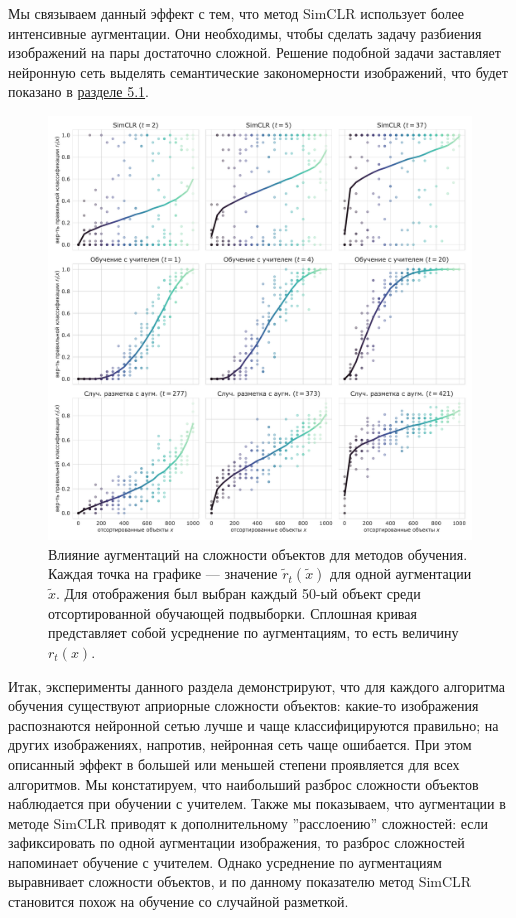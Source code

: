 Мы связываем данный эффект с тем, что метод SimCLR использует более интенсивные аугментации. Они необходимы, чтобы сделать задачу разбиения изображений на пары достаточно сложной. Решение подобной задачи заставляет нейронную сеть выделять семантические закономерности изображений, что будет показано в \hyperref[visual:1]{разделе 5.1}.

\begin{figure}[H]
    \centering
    \includegraphics[width=17cm]{images/augments.pdf}
    \caption{Влияние аугментаций на сложности объектов для методов обучения. Каждая точка на графике --- значение $\tilde{r}_t(\tilde{x})$ для одной аугментации $\tilde{x}$. Для отображения был выбран каждый 50-ый объект среди отсортированной обучающей подвыборки. Сплошная кривая представляет собой усреднение по аугментациям, то есть величину $r_t(x)$.}
    \label{experiments:pic:5}
\end{figure}{}

Итак, эксперименты данного раздела демонстрируют, что для каждого алгоритма обучения существуют априорные сложности объектов: какие-то изображения распознаются нейронной сетью лучше и чаще классифицируются правильно; на других изображениях, напротив, нейронная сеть чаще ошибается. При этом описанный эффект в большей или меньшей степени проявляется для всех алгоритмов. Мы констатируем, что наибольший разброс сложности объектов наблюдается при обучении с учителем. Также мы показываем, что аугментации в методе SimCLR приводят к дополнительному ''расслоению'' сложностей: если зафиксировать по одной аугментации изображения, то разброс сложностей напоминает обучение с учителем. Однако усреднение по аугментациям выравнивает сложности объектов, и по данному показателю метод SimCLR становится похож на обучение со случайной разметкой.
